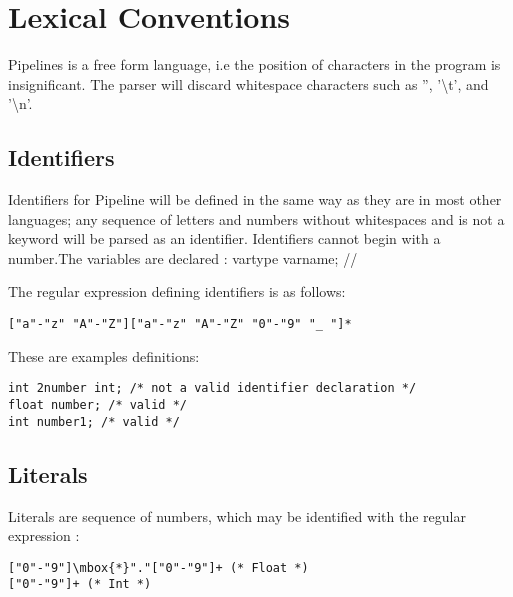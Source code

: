 \documentclass[./LRM_main.tex]{subfiles}
\begin{document}


\chapter{Lexical Conventions}

Pipelines is a free form language, i.e the position of characters in the program is insignificant. The parser will discard whitespace characters such as '', '\textbackslash t', and '\textbackslash n'. \\

\section{Identifiers}
Identifiers for Pipeline will be defined in the same way as they are in most other languages; any sequence of letters and numbers without whitespaces and is not a keyword will be parsed as an identifier. Identifiers cannot begin with a number.The variables are declared : vartype varname; //

The regular expression defining identifiers is as follows:  

\begin{lstlisting}
["a"-"z" "A"-"Z"]["a"-"z" "A"-"Z" "0"-"9" "_ "]*
\end{lstlisting}

These are examples definitions:

\begin{lstlisting}
int 2number int; /* not a valid identifier declaration */ 
float number; /* valid */ 
int number1; /* valid */
\end{lstlisting}

\section{Literals}
Literals are sequence of numbers, which may be identified with the regular expression : 
\begin{lstlisting}
["0"-"9"]\mbox{*}"."["0"-"9"]+ (* Float *)
["0"-"9"]+ (* Int *) 
\end{lstlisting}
\end{document}
